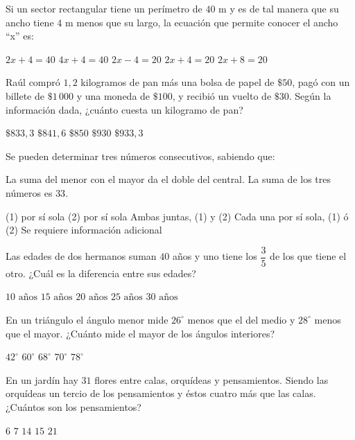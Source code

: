 \documentclass[sin nombre]{srs}
\begin{document}
\begin{preguntas}[after-item-skip=2cm]
\pregunta Si un sector rectangular tiene un perímetro de $40 \text{ m}$ y es de tal manera que su ancho tiene $4 \text{ m}$ menos que su largo, la ecuación que permite conocer el ancho “x” es:
\begin{vertical}
\alternativa $2x + 4 = 40$
\alternativa $4x + 4 = 40$
\alternativa $2x - 4 = 20$
\alternativa $2x + 4 = 20$
\alternativa $2x + 8 = 20$
\end{vertical}

\pregunta Raúl compró $1,2$ kilogramos de pan más una bolsa de papel de $\$50$, pagó con un billete de $\$1\,000$ y una moneda de $\$100$, y recibió un vuelto de $\$30$. Según la información dada, ¿cuánto cuesta un kilogramo de pan?
\begin{vertical}
\alternativa $\$833,3$
\alternativa $\$841,6$
\alternativa $\$850$
\alternativa $\$930$
\alternativa $\$933,3$
\end{vertical}

\pregunta Se pueden determinar tres números consecutivos, sabiendo que:
\begin{verticaln}
\alternativa La suma del menor con el mayor da el doble del central.
\alternativa La suma de los tres números es $33$.
\end{verticaln}
\begin{vertical}
\alternativa (1) por sí sola
\alternativa (2) por sí sola
\alternativa Ambas juntas, (1) y (2)
\alternativa Cada una por sí sola, (1) ó (2)
\alternativa Se requiere información adicional
\end{vertical}

\pregunta Las edades de dos hermanos suman $40$ años y uno tiene los $\dfrac{3}{5}$ de los que tiene el otro. ¿Cuál es la diferencia entre sus edades?
\begin{vertical}
\alternativa $10 \text{ años}$
\alternativa $15 \text{ años}$
\alternativa $20 \text{ años}$
\alternativa $25 \text{ años}$
\alternativa $30 \text{ años}$
\end{vertical}

\pregunta En un triángulo el ángulo menor mide $26^\circ$ menos que el del medio y $28^\circ$ menos que el mayor. ¿Cuánto mide el mayor de los ángulos interiores?
\begin{vertical}
\alternativa $42^\circ$
\alternativa $60^\circ$
\alternativa $68^\circ$
\alternativa $70^\circ$
\alternativa $78^\circ$
\end{vertical}

\pregunta En un jardín hay $31$ flores entre calas, orquídeas y pensamientos. Siendo las orquídeas un tercio de los pensamientos y éstos cuatro más que las calas. ¿Cuántos son los pensamientos?
\begin{vertical}
\alternativa $6$
\alternativa $7$
\alternativa $14$
\alternativa $15$
\alternativa $21$
\end{vertical}


\end{preguntas}
\end{document}
